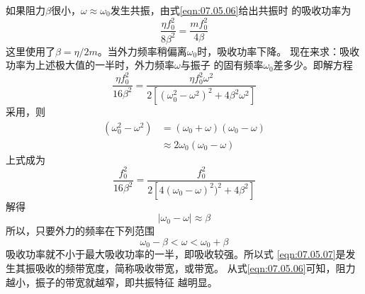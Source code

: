 如果阻力$ \beta $很小，$ \omega \approx \omega _ { 0 } $发生共振，由式\eqref{eqn:07.05.06}给出共振时
的吸收功率为
\begin{equation*}
    \frac { \eta f _ { 0 } ^ { 2 } } { 8 \beta ^ { 2 } } = \frac { m f _ { 0 } ^ { 2 } } { 4 \beta }
\end{equation*}
这里使用了$ \beta = \eta / 2 m $。当外力频率稍偏离$\omega_{ 0 }$时，吸收功率下降。
现在来求：吸收功率为上述极大值的一半时，外力频率$ \omega $与振子
的固有频率$ \omega_{ 0 } $差多少。即解方程
\begin{equation*}
    \frac { \eta f _ { 0 } ^ { 2 } } { 16 \beta ^ { 2 } }  = \frac { \eta f _ { 0 } ^ { 2 } \omega ^ { 2 } } { 2 [ ( \omega_{ 0 } ^ { 2 } - \omega ^ { 2 } ) ^ { 2 } + 4 \beta ^ { 2 } \omega ^ { 2 } ] }
\end{equation*}
采用，则
\begin{equation*}
    \begin{aligned}
    ( \omega _ { 0 } ^ { 2 } - \omega ^ { 2 } ) &= ( \omega _ { 0 } + \omega ) ( \omega _ { 0 } - \omega ) \\
    &\approx 2 \omega _ { 0 } ( \omega _ { 0 } - \omega )
    \end{aligned}
\end{equation*}
上式成为
\begin{equation*}
    \frac { f _ { 0 } ^ { 2 } } { 16 \beta ^ { 2 } }  = \frac { f _ { 0 } ^ { 2 } } { 2 [ 4 ( \omega_{ 0 } - \omega ) ^ { 2 } ) ^ { 2 } + 4 \beta ^ { 2 } ] }
\end{equation*}
解得
\begin{equation*}
    | \omega _ { 0 } - \omega | \approx \beta
\end{equation*}
所以，只要外力的频率在下列范围
\begin{equation}\label{eqn:07.05.07}
    \omega _ { 0 } - \beta < \omega < \omega _ { 0 } + \beta
\end{equation}
吸收功率就不小于最大吸收功率的一半，即吸收较强。所以式
\eqref{eqn:07.05.07}是发生其振吸收的频带宽度，简称吸收带宽，或带宽。
从式\eqref{eqn:07.05.06}可知，阻力越小，振子的带宽就越窄，即共振特征
越明显。